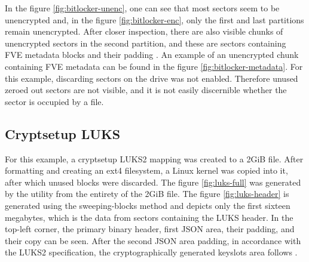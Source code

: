 \documentclass[
  digital, %
  color,   %
  oneside, %
  lof,     %
  nolot,     %
]{fithesis4}
\begin{document}
In the figure \ref{fig:bitlocker-unenc}, one can see that most sectors seem to be unencrypted and, in the figure \ref{fig:bitlocker-enc}, only the first and last partitions remain unencrypted.
After closer inspection, there are also visible chunks of unencrypted sectors in the second partition, and these are sectors containing FVE metadata blocks and their padding \cite{metz22}.
An example of an unencrypted chunk containing FVE metadata can be found in the figure \ref{fig:bitlocker-metadata}. 
For this example, discarding sectors on the drive was not enabled. 
Therefore unused zeroed out sectors are not visible, and it is not easily discernible whether the sector is occupied by a file.

\subsection{Cryptsetup LUKS}
\label{ssec:cryptsetup-luks}


For this example, a cryptsetup LUKS2 mapping was created to a 2GiB file.
After formatting and creating an ext4 filesystem, a Linux kernel was copied into it, after which unused blocks were discarded.
The figure \ref{fig:luks-full} was generated by the utility from the entirety of the 2GiB file.
The figure \ref{fig:luks-header} is generated using the sweeping-blocks method and depicts only the first sixteen megabytes, which is the data from sectors containing the LUKS header.
In the top-left corner, the primary binary header, first JSON area, their padding, and their copy can be seen.
After the second JSON area padding, in accordance with the LUKS2 specification, the cryptographically generated keyslots area follows \cite{broz22}.
\end{document}
